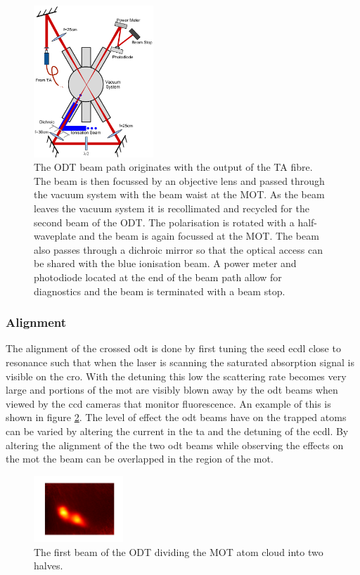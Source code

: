 \begin{figure}[h]
\centering
\includegraphics[width=0.4\textwidth]{figs/DipoleTrapRig.pdf}
\caption{The ODT beam path originates with the output of the TA fibre. The beam is then focussed by an objective lens and passed through the vacuum system with the beam waist at the MOT. As the beam leaves the vacuum system it is recollimated and recycled for the second beam of the ODT. The polarisation is rotated with a half-waveplate and the beam is again focussed at the MOT. The beam also passes through a dichroic mirror so that the optical access can be shared with the blue ionisation beam. A power meter and photodiode located at the end of the beam path allow for diagnostics and the beam is terminated with a beam stop.}
\label{fig:dipole_rig}
\end{figure}

\subsubsection{Alignment}

The alignment of the crossed \gls{odt} is done by first tuning the seed \gls{ecdl} close to resonance such that when the laser is scanning the saturated absorption signal is visible on the \gls{cro}. With the detuning this low the scattering rate becomes very large and portions of the \gls{mot} are visibly blown away by the \gls{odt} beams when viewed by the \gls{ccd} cameras that monitor fluorescence. An example of this is shown in figure \ref{fig:mot_slice}. The level of effect the \gls{odt} beams have on the trapped atoms can be varied by altering the current in the \gls{ta} and the detuning of the \gls{ecdl}. By altering the alignment of the the two \gls{odt} beams while observing the effects on the \gls{mot} the beam can be overlapped in the region of the \gls{mot}.

\begin{figure}[H]
\centering
\includegraphics[width=0.3\textwidth]{figs/mot_slice.pdf}
\caption{The first beam of the ODT dividing the MOT atom cloud into two halves.}
\label{fig:mot_slice}
\end{figure}

